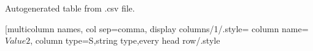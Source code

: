 \documentclass{article}
\begin{document}
\begin{table}[!h]
\begin{center}
\caption{Autogenerated table from .csv file.}
\label{table1}
\pgfplotstabletypeset[multicolumn names,%
col sep=comma,%
display columns/1/.style={
	column name=$Value 2$,
	column type={S},string type},every head row/.style
\end{center}

\end{table}
\end{document}
